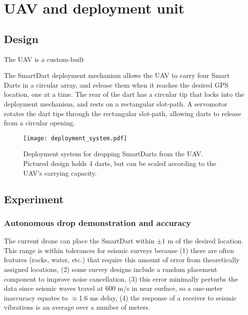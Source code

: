 \section{UAV and deployment unit}\label{sec:DeploymentUnit(UAV)}

\subsection{Design}
The UAV is a custom-built 

 The SmartDart deployment mechanism allows the UAV to carry four Smart Darts in a circular array, and release them when it reaches the desired GPS location, one at a time. 
 The rear of the dart has a circular tip that locks into the deployment mechanism, and rests on a rectangular slot-path. 
 A servomotor rotates the dart tips through the rectangular slot-path, allowing darts to release from a circular opening.



\begin{figure} \centering
  {\texttt{[image: deployment\_system.pdf]}}
 \caption{Deployment system for dropping SmartDarts from the UAV. Pictured design holds 4 darts, but can be scaled according to the UAV's carrying capacity.} 
 \label{fig:TradvsAutoDrop}
\end{figure}



\subsection{Experiment}


\subsubsection{Autonomous drop demonstration and accuracy}

The current drone can place the SmartDart within $\pm1$ m of the desired location.  
This range is within tolerances for seismic surveys because
(1) there are often features (rocks, water, etc.) that require this amount of error from theoretically assigned locations,
(2) some survey designs include a random placement component to improve noise cancellation,
(3) this error minimally perturbs  the data since seismic waves travel at 600 m/s in near surface, so a one-meter inaccuracy equates to $\approx$1.6 ms delay,
(4) the response of a receiver to seismic vibrations is an average over a number of meters.

